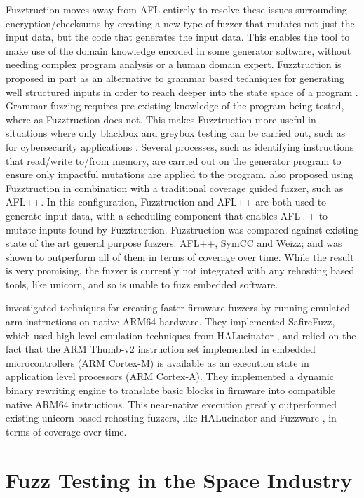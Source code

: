 \documentclass[../report.tex]{subfiles}
\begin{document}
Fuzztruction \citep{Fuzztruction_2023} moves away from AFL entirely to resolve
these issues surrounding encryption/checksums by creating a new type of fuzzer
that mutates not just the input data, but the code that generates the input
data. This enables the tool to make use of the domain knowledge encoded in some
generator software, without needing complex program analysis or a human domain
expert. Fuzztruction is proposed in part as an alternative to grammar based
techniques for generating well structured inputs in order to reach deeper into
the state space of a program \citep{Fuzztruction_2023}. Grammar fuzzing
requires pre-existing knowledge of the program being tested, where as
Fuzztruction does not. This makes Fuzztruction more useful in situations where
only blackbox and greybox testing can be carried out, such as for cybersecurity
applications \citep{Fuzztruction_2023}. Several processes, such as identifying
instructions that read/write to/from memory, are carried out on the generator
program to ensure only impactful mutations are applied to the program.
\citet{Fuzztruction_2023} also proposed using Fuzztruction in combination with
a traditional coverage guided fuzzer, such as AFL++. In this configuration,
Fuzztruction and AFL++ are both used to generate input data, with a scheduling
component that enables AFL++ to mutate inputs found by Fuzztruction.
Fuzztruction was compared against existing state of the art general purpose
fuzzers: AFL++, SymCC and Weizz; and was shown to outperform all of them in
terms of coverage over time. While the result is very promising, the fuzzer is
currently not integrated with any rehosting based tools, like unicorn, and so
is unable to fuzz embedded software.

\citet{Seidel_2023} investigated techniques for creating faster firmware
fuzzers by running emulated arm instructions on native ARM64 hardware. They
implemented SafireFuzz, which used high level emulation techniques from
HALucinator \citep{HALucinator_2020}, and relied on the fact that the ARM
Thumb-v2 instruction set implemented in embedded microcontrollers (ARM
Cortex-M) is available as an execution state in application level processors
(ARM Cortex-A). They implemented a dynamic binary rewriting engine to translate
basic blocks in firmware into compatible native ARM64 instructions. This
near-native execution greatly outperformed existing unicorn based rehosting
fuzzers, like HALucinator \citep{HALucinator_2020} and Fuzzware
\citep{Fuzzware_2022}, in terms of coverage over time.

\section{Fuzz Testing in the Space Industry}
\end{document}

